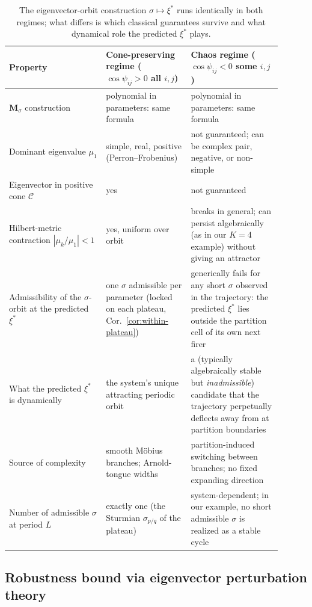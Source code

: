 \documentclass[12pt]{article}
\newcommand{\vv}[1]{\mathbf{#1}}
\begin{document}
\begin{table}[h]
\centering
\renewcommand{\arraystretch}{1.2}
\begin{tabular}{p{0.32\linewidth}p{0.28\linewidth}p{0.30\linewidth}}
\hline
\textbf{Property} & \textbf{Cone-preserving regime} ($\cos\psi_{ij}>0$ all $i,j$) & \textbf{Chaos regime} ($\cos\psi_{ij}<0$ some $i,j$) \\
\hline
$\vv{M}_\sigma$ construction & polynomial in parameters: same formula & polynomial in parameters: same formula \\
Dominant eigenvalue $\mu_1$ & simple, real, positive (Perron--Frobenius) & not guaranteed; can be complex pair, negative, or non-simple \\
Eigenvector in positive cone $\mathcal{C}$ & yes & not guaranteed \\
Hilbert-metric contraction $|\mu_k/\mu_1|<1$ & yes, uniform over orbit & breaks in general; can persist algebraically (as in our $K{=}4$ example) without giving an attractor \\
Admissibility of the $\sigma$-orbit at the predicted $\xi^*$ & one $\sigma$ admissible per parameter (locked on each plateau, Cor.~\ref{cor:within-plateau}) & generically fails for any short $\sigma$ observed in the trajectory: the predicted $\xi^*$ lies outside the partition cell of its own next firer \\
What the predicted $\xi^*$ is dynamically & the system's unique attracting periodic orbit & a (typically algebraically stable but \emph{inadmissible}) candidate that the trajectory perpetually deflects away from at partition boundaries \\
Source of complexity & smooth M\"obius branches; Arnold-tongue widths & partition-induced switching between branches; no fixed expanding direction \\
Number of admissible $\sigma$ at period $L$ & exactly one (the Sturmian $\sigma_{p/q}$ of the plateau) & system-dependent; in our example, no short admissible $\sigma$ is realized as a stable cycle \\
\hline
\end{tabular}
\caption{The eigenvector-orbit construction $\sigma\mapsto\xi^*$ runs identically in both regimes; what differs is which classical guarantees survive and what dynamical role the predicted $\xi^*$ plays.}
\label{tab:cone-vs-chaos}
\end{table}

\subsection{Robustness bound via eigenvector perturbation theory}\label{app:robustness}
\end{document}
